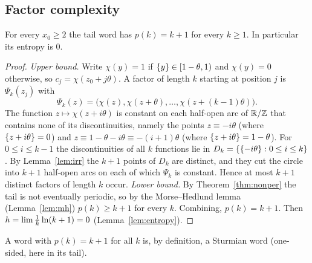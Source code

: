\subsection{Factor complexity}
\begin{theorem}\label{thm:cx}
For every $x_0\ge2$ the tail word has $p(k)=k+1$ for every $k\ge1$. In particular its entropy is $0$.
\end{theorem}
\begin{proof}
\emph{Upper bound.} Write $\chi(y)=1$ if $\{y\}\in[1-\theta,1)$ and $\chi(y)=0$ otherwise, so $c_j=\chi(z_0+j\theta)$. A factor of length $k$ starting at position $j$ is $\Psi_k(z_j)$ with
\[
\Psi_k(z)=\bigl(\chi(z),\chi(z+\theta),\dots,\chi(z+(k-1)\theta)\bigr).
\]
The function $z\mapsto\chi(z+i\theta)$ is constant on each half-open arc of $\mathbb{R}/\mathbb{Z}$ that contains none of its discontinuities, namely the points $z\equiv-i\theta$ (where $\{z+i\theta\}=0$) and $z\equiv1-\theta-i\theta\equiv-(i+1)\theta$ (where $\{z+i\theta\}=1-\theta$). For $0\le i\le k-1$ the discontinuities of all $k$ functions lie in $D_k=\{\{-i\theta\}:0\le i\le k\}$. By Lemma~\ref{lem:irr} the $k+1$ points of $D_k$ are distinct, and they cut the circle into $k+1$ half-open arcs on each of which $\Psi_k$ is constant. Hence at most $k+1$ distinct factors of length $k$ occur.
\emph{Lower bound.} By Theorem~\ref{thm:nonper} the tail is not eventually periodic, so by the Morse--Hedlund lemma (Lemma~\ref{lem:mh}) $p(k)\ge k+1$ for every $k$. Combining, $p(k)=k+1$. Then $h=\lim\frac1k\ln(k+1)=0$ (Lemma~\ref{lem:entropy}). \end{proof}
A word with $p(k)=k+1$ for all $k$ is, by definition, a Sturmian word (one-sided, here in its tail).

